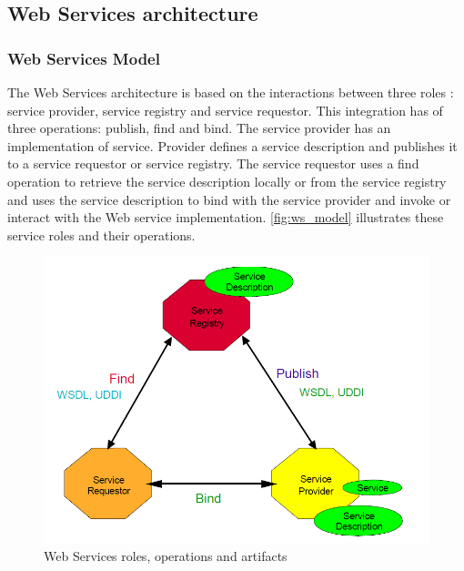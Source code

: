 \subsection{Web Services architecture}
\subsubsection{Web Services Model}
The Web Services architecture is based on the interactions between three
roles \cite{Kreger2001-WSC}:
service provider, service registry and service requestor. 
This integration has of three operations: publish, find and
bind. The service provider has an implementation of service. Provider defines a
service description and publishes it to a service requestor or service registry.
The service requestor uses a find operation to retrieve the service
description locally or from the service registry and uses the service description to bind with the
service provider and invoke or interact with the Web service implementation.
\autoref{fig:ws_model} illustrates these service roles and their operations.


\begin{center}
 \begin{figure}[H]
	\includegraphics[width=\textwidth]{../images/background/ws_model.png}
	\caption{Web Services roles, operations and artifacts \cite{Kreger2001-WSC}}
	\label{fig:ws_model}
 \end{figure}
\end{center}

